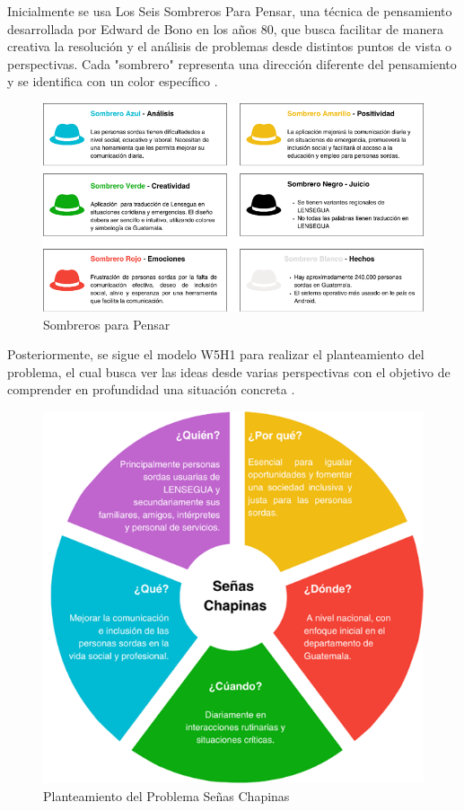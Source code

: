 Inicialmente se usa Los Seis Sombreros Para Pensar, una técnica de pensamiento desarrollada por Edward de Bono en los años 80, que busca facilitar de manera creativa la resolución y el análisis de problemas desde distintos puntos de vista o perspectivas. Cada "sombrero" representa una dirección diferente del pensamiento y se identifica con un color específico \cite{Santos2024}.

\begin{figure} [H]
    \centering
    \includegraphics[width=0.8\linewidth]{figuras/sombreros.png}
    \caption{Sombreros para Pensar}
    \label{fig:enter-label}
\end{figure}


Posteriormente, se sigue el modelo W5H1 para realizar el planteamiento del problema, el cual busca ver las ideas desde varias perspectivas con el objetivo de comprender en profundidad una situación concreta \cite{Artigas2017}.

\begin{figure} [H]
    \centering
    \includegraphics[width=0.6\linewidth]{figuras/w5h1.png}
    \caption{Planteamiento del Problema Señas Chapinas}
    \label{fig:enter-label}
\end{figure}


